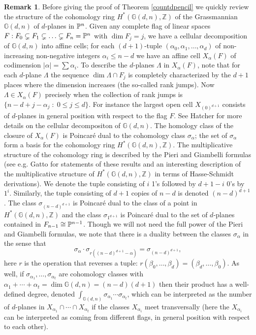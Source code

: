 \documentclass[12pt]{article}
\theoremstyle{plain}
\theoremstyle{definition}
\newtheorem{remark}[theorem]{Remark}
\newcommand{\Z}{\mathbb{Z}}
\newcommand{\G}{\mathbb{G}}
\renewcommand{\P}{\ensuremath \mathbb{P}}
\begin{document}
\begin{remark} Before giving the proof of Theorem \ref{countdpencil} we quickly
review the structure of the cohomology ring $H^*(\G(d,n),\Z)$ of the
Grassmannian $\G(d,n)$ of $d$-planes in $\P^n$. Given any complete
flag of linear spaces $F: F_0 \subsetneq F_1 \subsetneq \ldots
\subsetneq F_{n} = \P^n$ with $\dim F_j = j$, we have a cellular
decomposition of $\G(d,n)$ into affine cells; for each $(d+1)$-tuple
$(\alpha_0, \alpha_1, \ldots, \alpha_{d})$ of
non-increasing non-negative integers $\alpha_i \leq n-d$ we have an
affine cell $X_{\alpha}(F)$ 
of codimension $| \alpha | = \sum \alpha_i$. To describe the
$d$-planes $\Lambda$ in $X_{\alpha}(F)$, note that for each $d$-plane
$\Lambda$ the sequence $\dim \Lambda \cap F_j$ is completely
characterized by the $d+1$ places where the dimension increases (the
so-called rank jumps). Now $\Lambda \in X_{\alpha}(F)$ precisely when
the collection of rank jumps is $\{n-d+j-\alpha_j \; : \; 0 \leq j \leq
d\}$. For instance the largest open cell $X_{(0)^{d+1}}$ consists of
$d$-planes in general position with respect to the flag $F$.  See
Hatcher \cite{Hatcher} for more details on the cellular decompositon
of $\G(d,n)$. The homology class of the closure of $X_\alpha(F)$ is
Poincar\'e dual to the cohomology class $\sigma_\alpha$; the set of
$\sigma_\alpha$ form a basis for the cohomology ring
$H^*(\G(d,n),\Z)$. The multiplicative structure of the cohomology ring
is described by the Pieri and Giambelli formulas (see e.g. Gatto
\cite{GattoASC,GattoIMPA} for statements of these results and an
interesting description of the multiplicative structure of
$H^*(\G(d,n),\Z)$ in terms of Hasse-Schmidt derivations). We denote
the tuple consisting of $i$ 1's followed by $d+1-i$ 0's by
$1^i$. Similarly, the tuple consisting of $d+1$ copies of $n-d$ is
denoted $(n-d)^{d+1}$. The class $\sigma_{(n-d)^{d+1}}$ is Poincar\'e
dual to the class of a point in $H^*(\G(d,n),\Z)$ and the class
$\sigma_{1^{d+1}}$ is Poincar\'e dual to the set of $d$-planes
contained in $F_{n-1} \cong \P^{n-1}$.  Though we will not need the
full power of the Pieri and Giambelli formulas, we note that there is
a duality between the classes $\sigma_\alpha$ in the sense that
$$\sigma_\alpha \cdot \sigma_{r((n-d)^{d+1}-\alpha)} =
\sigma_{(n-d)^{d+1}},$$ here $r$ is the operation that reverses a
tuple: $r(\beta_0,\ldots,\beta_{d}) =
(\beta_d,\ldots,\beta_0)$. As well, if $\sigma_{\alpha_1}, \ldots,
\sigma_{\alpha_t}$ are cohomology classes with
$\alpha_{1}+\cdots+\alpha_t = \dim \G(d,n) = (n-d)(d+1)$ then their
product has a well-defined degree, denoted $\int_{\G(d,n)}
\sigma_{\alpha_1} \cdots \sigma_{\alpha_t}$, which can be interpreted
as the number of $d$-planes in $X_{\alpha_1} \cap \cdots \cap
X_{\alpha_t}$ if the classes $X_{\alpha_i}$ meet transversally (here
the $X_{\alpha_i}$ can be interpreted as coming from different flags,
in general position with respect to each other).
\end{remark}
\end{document}

